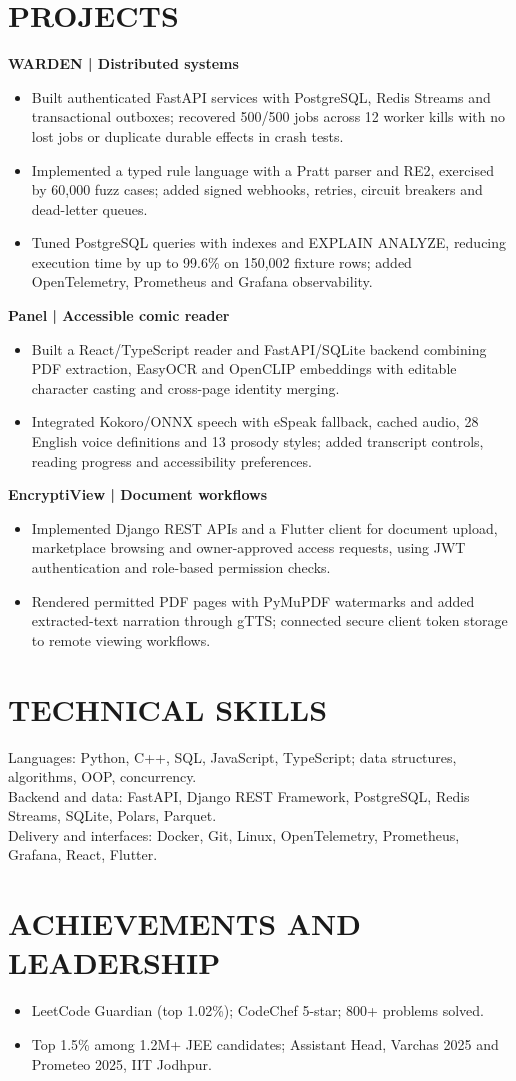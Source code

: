 \documentclass[10pt,a4paper]{article}
\begin{document}
\section*{PROJECTS}
\textbf{WARDEN | Distributed systems}
\begin{itemize}
\item Built authenticated FastAPI services with PostgreSQL, Redis Streams and transactional outboxes; recovered 500/500 jobs across 12 worker kills with no lost jobs or duplicate durable effects in crash tests.
\item Implemented a typed rule language with a Pratt parser and RE2, exercised by 60,000 fuzz cases; added signed webhooks, retries, circuit breakers and dead-letter queues.
\item Tuned PostgreSQL queries with indexes and EXPLAIN ANALYZE, reducing execution time by up to 99.6\% on 150,002 fixture rows; added OpenTelemetry, Prometheus and Grafana observability.
\end{itemize}
\textbf{Panel | Accessible comic reader}
\begin{itemize}
\item Built a React/TypeScript reader and FastAPI/SQLite backend combining PDF extraction, EasyOCR and OpenCLIP embeddings with editable character casting and cross-page identity merging.
\item Integrated Kokoro/ONNX speech with eSpeak fallback, cached audio, 28 English voice definitions and 13 prosody styles; added transcript controls, reading progress and accessibility preferences.
\end{itemize}
\textbf{EncryptiView | Document workflows}
\begin{itemize}
\item Implemented Django REST APIs and a Flutter client for document upload, marketplace browsing and owner-approved access requests, using JWT authentication and role-based permission checks.
\item Rendered permitted PDF pages with PyMuPDF watermarks and added extracted-text narration through gTTS; connected secure client token storage to remote viewing workflows.
\end{itemize}
\section*{TECHNICAL SKILLS}
Languages: Python, C++, SQL, JavaScript, TypeScript; data structures, algorithms, OOP, concurrency.\\[2pt]
Backend and data: FastAPI, Django REST Framework, PostgreSQL, Redis Streams, SQLite, Polars, Parquet.\\[2pt]
Delivery and interfaces: Docker, Git, Linux, OpenTelemetry, Prometheus, Grafana, React, Flutter.
\section*{ACHIEVEMENTS AND LEADERSHIP}
\begin{itemize}
\item LeetCode Guardian (top 1.02\%); CodeChef 5-star; 800+ problems solved.
\item Top 1.5\% among 1.2M+ JEE candidates; Assistant Head, Varchas 2025 and Prometeo 2025, IIT Jodhpur.
\end{itemize}
\end{document}
